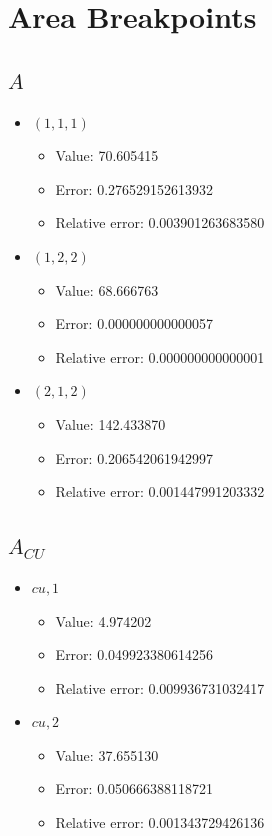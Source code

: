 \documentclass{article}%
\begin{document}
\section{Area Breakpoints}%
\thispagestyle{plain}%
\subsection{$A$}%
\begin{itemize}%
	\item $(1, 1, 1)$%
	\begin{itemize}%
		\item Value: 70.605415%
		\item Error: 0.276529152613932%
		\item Relative error: 0.003901263683580%
	\end{itemize}%
	\item $(1, 2, 2)$%
	\begin{itemize}%
		\item Value: 68.666763%
		\item Error: 0.000000000000057%
		\item Relative error: 0.000000000000001%
	\end{itemize}%
	\item $(2, 1, 2)$%
	\begin{itemize}%
		\item Value: 142.433870%
		\item Error: 0.206542061942997%
		\item Relative error: 0.001447991203332%
	\end{itemize}%
\end{itemize}%
\subsection{$A_{CU}$}%
\begin{itemize}%
	\item $\textit{cu},1$%
	\begin{itemize}%
		\item Value: 4.974202%
		\item Error: 0.049923380614256%
		\item Relative error: 0.009936731032417%
	\end{itemize}%
	\item $\textit{cu},2$%
	\begin{itemize}%
		\item Value: 37.655130%
		\item Error: 0.050666388118721%
		\item Relative error: 0.001343729426136%
	\end{itemize}%
\end{itemize}%
\end{document}
